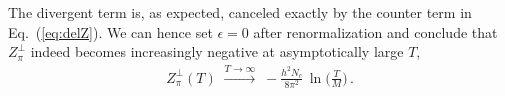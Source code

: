 \documentclass[reprint,english,superscriptaddress,preprintnumbers,amsmath,amssymb,aps,prd]{revtex4-2}
\def\Eq#1{Eq.~(\ref{#1})}
\begin{document}
The divergent term is, as expected, canceled exactly by the counter term in \Eq{eq:delZ}. We can hence set $\epsilon = 0$ after renormalization and conclude that $Z_\pi^\perp$ indeed becomes increasingly negative at asymptotically large $T$,
\begin{align}
  Z_\pi^\perp(T) \;\xrightarrow{T\rightarrow \infty}\; - \frac{h^2 N_c}{ 8\pi^2}\, \ln\bigg(\frac{T}{M}\bigg)\,.
\end{align}
\vfill

\end{document}
